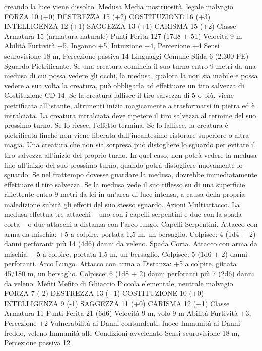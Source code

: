 \begin{multicols}{2}
creando la luce viene dissolto.
Medusa
Media mostruosità, legale malvagio
FORZA 10 (+0)
DESTREZZA 15 (+2)
COSTITUZIONE 16 (+3)
INTELLIGENZA 12 (+1)
SAGGEZZA 13 (+1)
CARISMA 15 (+2)
Classe Armatura 15 (armatura naturale)
Punti Ferita 127 (17d8 + 51)
Velocità 9 m
Abilità Furtività +5, Inganno +5, Intuizione +4, Percezione +4
Sensi scurovisione 18 m, Percezione passiva 14
Linguaggi Comune
Sfida 6 (2.300 PE)
Sguardo Pietrificante. Se una creatura comincia il suo turno
entro 9 metri da una medusa di cui possa vedere gli occhi, la
medusa, qualora la non sia inabile e possa vedere a sua volta la
creatura, può obbligarla ad effettuare un tiro salvezza di
Costituzione CD 14. Se la creatura fallisce il tiro salvezza di 5 o
più, viene pietrificata all’istante, altrimenti inizia magicamente a
trasformarsi in pietra ed è intralciata. La creatura intralciata deve
ripetere il tiro salvezza al termine del suo prossimo turno. Se lo
riesce, l’effetto termina. Se lo fallisce, la creatura è pietrificata
finché non viene liberata dall’incantesimo ristorare superiore o
altra magia.
Una creatura che non sia sorpresa può distogliere lo sguardo per
evitare il tiro salvezza all’inizio del proprio turno. In quel caso,
non potrà vedere la medusa fino all’inizio del suo prossimo
turno, quando potrà distogliere nuovamente lo sguardo. Se nel
frattempo dovesse guardare la medusa, dovrebbe
immediatamente effettuare il tiro salvezza.
Se la medusa vede il suo riflesso su di una superficie riflettente
entro 9 metri da lei in un’area di luce intensa, a causa della
propria maledizione subirà gli effetti del suo stesso sguardo.
Azioni
Multiattacco. La medusa effettua tre attacchi – uno con i capelli
serpentini e due con la spada corta – o due attacchi a distanza
con l’arco lungo.
Capelli Serpentini. Attacco con arma da mischia: +5 a colpire,
portata 1,5 m, un bersaglio.
Colpisce: 4 (1d4 + 2) danni perforanti più 14 (4d6) danni da
veleno.
Spada Corta. Attacco con arma da mischia: +5 a colpire, portata
1,5 m, un bersaglio.
Colpisce: 5 (1d6 + 2) danni perforanti.
Arco Lungo. Attacco con arma a Distanza: +5 a colpire, gittata
45/180 m, un bersaglio.
Colpisce: 6 (1d8 + 2) danni perforanti più 7 (2d6) danni da
veleno.
Mefiti
Mefito di Ghiaccio
Piccola elementale, neutrale malvagio
FORZA 7 (-2)
DESTREZZA 13 (+1)
COSTITUZIONE 10 (+0)
INTELLIGENZA 9 (-1)
SAGGEZZA 11 (+0)
CARISMA 12 (+1)
Classe Armatura 11
Punti Ferita 21 (6d6)
Velocità 9 m, volo 9 m
Abilità Furtività +3, Percezione +2
Vulnerabilità ai Danni contundenti, fuoco
Immunità ai Danni freddo, veleno
Immunità alle Condizioni avvelenato
Sensi scurovisione 18 m, Percezione passiva 12

\end{multicols}
